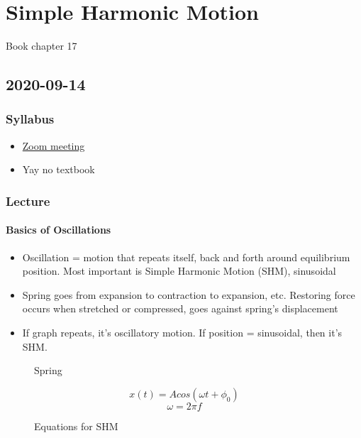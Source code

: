 \chapter{Simple Harmonic Motion}

Book chapter 17

\section{2020-09-14}

\subsection{Syllabus}

\begin{itemize}
    \item \href{https://calpoly.zoom.us/j/680327688}{Zoom meeting}
    \item Yay no textbook
\end{itemize}

\subsection{Lecture}

\subsubsection{Basics of Oscillations}

\begin{itemize}
    \item Oscillation = motion that repeats itself, back and forth around equilibrium position. Most important is Simple Harmonic Motion (SHM), sinusoidal
    \item Spring goes from expansion to contraction to expansion, etc. Restoring force occurs when stretched or compressed, goes against spring's displacement
    \item If graph repeats, it's oscillatory motion. If position = sinusoidal, then it's SHM. 
\end{itemize}

\begin{figure}
    \centering
    
    \caption{Spring}
\end{figure}

\begin{figure}
    \centering
    
    $$x(t) = Acos(\omega t + \phi_0)$$
    $$\omega = 2 \pi f$$
    
    \caption{Equations for SHM}
    \label{}
\end{figure}

